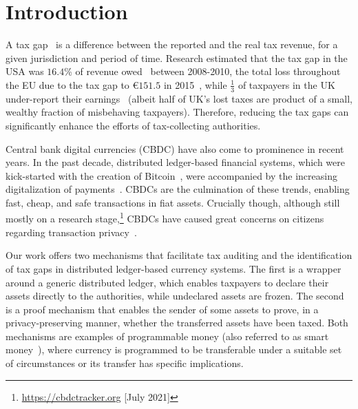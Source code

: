 \section{Introduction}\label{sec:introduction}

A tax gap~\cite{comission2018taxgaps} is a difference between the reported and
the real tax revenue, for a given jurisdiction and period of time. Research
estimated that the tax gap in the USA was $16.4$\% of revenue
owed~\cite{internal2016federal} between 2008-2010, the total loss throughout
the EU due to the tax gap to €$151.5$ in 2015~\cite{murphy2018resources}, while
$\frac{1}{3}$ of taxpayers in the UK under-report their
earnings~\cite{advani2020does} (albeit half of UK's lost taxes are product of a
small, wealthy fraction of misbehaving taxpayers). Therefore, reducing the tax
gaps can significantly enhance the efforts of tax-collecting authorities.

Central bank digital currencies (CBDC) have also come to prominence in recent
years. In the past decade, distributed ledger-based financial systems, which
were kick-started with the creation of Bitcoin~\cite{nakamoto2008bitcoin}, were
accompanied by the increasing digitalization of payments~\cite{bis2011digital}.
CBDCs are the culmination of these trends, enabling fast, cheap, and safe
transactions in fiat assets. Crucially though, although still mostly on a
research stage,\footnote{\url{https://cbdctracker.org} [July 2021]} CBDCs have
caused great concerns on citizens regarding transaction
privacy~\cite{ecb2021cbdcprivacy}.

Our work offers two mechanisms that facilitate tax auditing and the
identification of tax gaps in distributed ledger-based currency systems. The
first is a wrapper around a generic distributed ledger, which enables taxpayers
to declare their assets directly to the authorities, while undeclared assets
are frozen. The second is a proof mechanism that enables the sender of some
assets to prove, in a privacy-preserving manner, whether the transferred assets
have been taxed. Both mechanisms are examples of programmable money (also referred to as smart money~\cite{AHA}),
where currency is programmed to be transferable under a suitable set of  circumstances or its transfer has specific implications.
